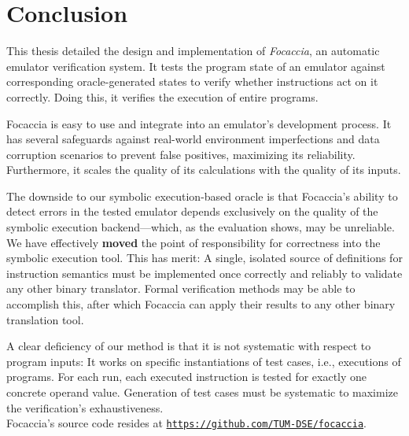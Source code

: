 \chapter{Conclusion}

This thesis detailed the design and implementation of \textit{Focaccia}, an automatic emulator verification system. It
tests the program state of an emulator against corresponding oracle-generated states to verify whether instructions act
on it correctly. Doing this, it verifies the execution of entire programs.

Focaccia is easy to use and integrate into an emulator's development process. It has several safeguards against
real-world environment imperfections and data corruption scenarios to prevent false positives, maximizing its
reliability. Furthermore, it scales the quality of its calculations with the quality of its inputs.

The downside to our symbolic execution-based oracle is that Focaccia's ability to detect errors in the tested emulator
depends exclusively on the quality of the symbolic execution backend---which, as the evaluation shows, may be
unreliable. We have effectively \textbf{moved} the point of responsibility for correctness into the symbolic execution
tool. This has merit: A single, isolated source of definitions for instruction semantics must be implemented once
correctly and reliably to validate any other binary translator. Formal verification methods may be able to accomplish
this, after which Focaccia can apply their results to any other binary translation tool.

A clear deficiency of our method is that it is not systematic with respect to program inputs: It works on specific
instantiations of test cases, i.e., executions of programs. For each run, each executed instruction is tested for
exactly one concrete operand value. Generation of test cases must be systematic to maximize the verification's
exhaustiveness.
\\

Focaccia's source code resides at
\href{https://github.com/TUM-DSE/focaccia}{\texttt{https://github.com/TUM-DSE/focaccia}}.
